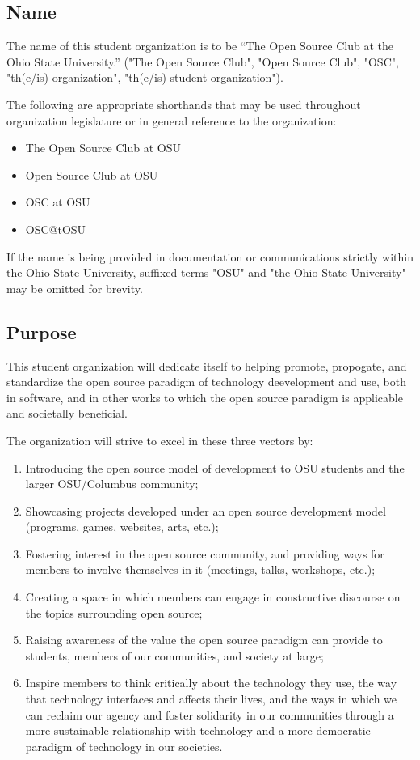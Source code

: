 \documentclass[12pt,letterpaper]{article}
\begin{document}
\subsection{Name}

The name of this student organization is to be ``The Open Source Club at the Ohio State
University.'' ("The Open Source Club", "Open Source  Club", "OSC", "th(e/is) organization",
"th(e/is) student organization").

The following are appropriate shorthands that may be used throughout organization legislature
or in general reference to the organization:

\begin{itemize}
  \item The Open Source Club at OSU
  \item Open Source Club at OSU
  \item OSC at OSU
  \item OSC@tOSU
\end{itemize}

If the name is being provided in documentation or communications strictly within the
Ohio State University, suffixed terms "OSU" and "the Ohio State University" may be omitted
for brevity.

\subsection{Purpose}

This student organization will dedicate itself to helping promote, propogate, and standardize
the open source paradigm of technology deevelopment and use, both in software, and in other
works to which the open source paradigm is applicable and societally beneficial.

The organization will strive to excel in these three vectors by:

\begin{enumerate}[label=\textcolor{crimsonred}{\alph*.}, leftmargin=2em]
  \item Introducing the open source model of development to OSU students and the larger
    OSU/Columbus community;
  \item Showcasing projects developed under an open source development model (programs,
    games, websites, arts, etc.);
  \item Fostering interest in the open source community, and providing ways for members
    to involve themselves in it (meetings, talks, workshops, etc.);
  \item Creating a space in which members can engage in constructive discourse on the
    topics surrounding open source;
  \item Raising awareness of the value the open source paradigm can provide to students,
    members of our communities, and society at large;
  \item Inspire members to think critically about the technology they use, the way that
    technology interfaces and affects their lives, and the ways in which we can reclaim
    our agency and foster solidarity in our communities through a more sustainable
    relationship with technology and a more democratic paradigm of technology in our societies.
\end{enumerate}
\end{document}

